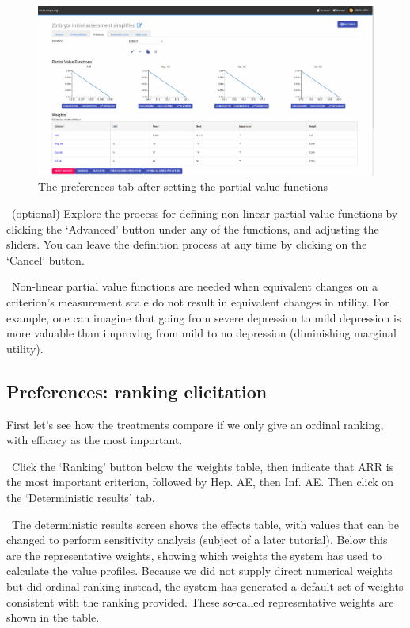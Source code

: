 \documentclass[00_mcda_tutorial.tex]{subfiles}
\begin{document}
\begin{figure}[!h]
  \centering
  \includegraphics[width=\textwidth]{fig/preferences.png}
  \caption{The preferences tab after setting the partial value functions}
  \label{fig:preferences}
\end{figure}

\noindent \leftpointright \, (optional) Explore the process for defining non-linear partial value functions by clicking the ‘Advanced’ button under any of the functions, and adjusting the sliders. You can leave the definition process at any time by clicking on the ‘Cancel’ button.
\newline

\noindent \faGraduationCap \, Non-linear partial value functions are needed when equivalent changes on a criterion’s measurement scale do not result in equivalent changes in utility.  For example, one can imagine that going from severe depression to mild depression is more valuable than improving from mild to no depression (diminishing marginal utility).

\subsection*{Preferences: ranking elicitation}
First let’s see how the treatments compare if we only give an ordinal ranking, with efficacy as the most important.
\newline

\noindent \leftpointright \, Click the ‘Ranking’ button below the weights table, then indicate that ARR is the most important criterion, followed by Hep. AE, then Inf. AE. Then click on the ‘Deterministic results’ tab.
\newline

\noindent \faGraduationCap \, The deterministic results screen shows the effects table, with values that can be changed to perform sensitivity analysis (subject of a later tutorial). Below this are the representative weights, showing which weights the system has used to calculate the value profiles. Because we did not supply direct numerical weights but did ordinal ranking instead, the system has generated a default set of weights consistent with the ranking provided. These so-called representative weights are shown in the table.
\newline
\end{document}

